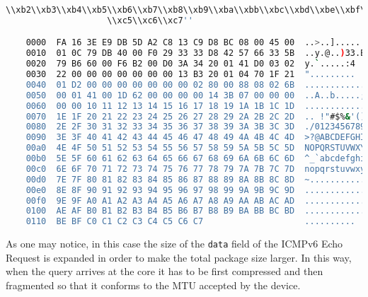 \documentclass[onecolumn,12pt]{book}
\newcounter{c}
\begin{document}
\begin{lstlisting}[language=bash, basicstyle=\ttfamily\tiny, showstringspaces=false]
                    \\xb2\\xb3\\xb4\\xb5\\xb6\\xb7\\xb8\\xb9\\xba\\xbb\\xbc\\xbd\\xbe\\xbf\\xc0\\xc1\\xc2\\xc3\\xc4
                    \\xc5\\xc6\\xc7''

    0000  FA 16 3E E9 DB 5D A2 C8 13 C9 D8 BC 08 00 45 00  ..>..]........E.
    0010  01 0C 79 DB 40 00 F0 29 33 33 D8 42 57 66 33 5B  ..y.@..)33.BWf3[
    0020  79 B6 60 00 F6 B2 00 D0 3A 34 20 01 41 D0 03 02  y.`.....:4 .A...
    0030  22 00 00 00 00 00 00 00 13 B3 20 01 04 70 1F 21  "......... ..p.!
    0040  01 D2 00 00 00 00 00 00 00 02 80 00 88 08 02 6B  ...............k
    0050  00 01 41 00 1D 62 00 00 00 00 14 3B 07 00 00 00  ..A..b.....;....
    0060  00 00 10 11 12 13 14 15 16 17 18 19 1A 1B 1C 1D  ................
    0070  1E 1F 20 21 22 23 24 25 26 27 28 29 2A 2B 2C 2D  .. !"#$%&'()*+,-
    0080  2E 2F 30 31 32 33 34 35 36 37 38 39 3A 3B 3C 3D  ./0123456789:;<=
    0090  3E 3F 40 41 42 43 44 45 46 47 48 49 4A 4B 4C 4D  >?@ABCDEFGHIJKLM
    00a0  4E 4F 50 51 52 53 54 55 56 57 58 59 5A 5B 5C 5D  NOPQRSTUVWXYZ[\]
    00b0  5E 5F 60 61 62 63 64 65 66 67 68 69 6A 6B 6C 6D  ^_`abcdefghijklm
    00c0  6E 6F 70 71 72 73 74 75 76 77 78 79 7A 7B 7C 7D  nopqrstuvwxyz{|}
    00d0  7E 7F 80 81 82 83 84 85 86 87 88 89 8A 8B 8C 8D  ~...............
    00e0  8E 8F 90 91 92 93 94 95 96 97 98 99 9A 9B 9C 9D  ................
    00f0  9E 9F A0 A1 A2 A3 A4 A5 A6 A7 A8 A9 AA AB AC AD  ................
    0100  AE AF B0 B1 B2 B3 B4 B5 B6 B7 B8 B9 BA BB BC BD  ................
    0110  BE BF C0 C1 C2 C3 C4 C5 C6 C7                    ..........
\end{lstlisting}

As one may notice, in this case the size of the \texttt{data} field of the ICMPv6 Echo Request is expanded in order to make the total package size larger. 
In this way, when the query arrives at the core it has to be first compressed and then fragmented so that it conforms to the MTU accepted by the device.
\end{document}
